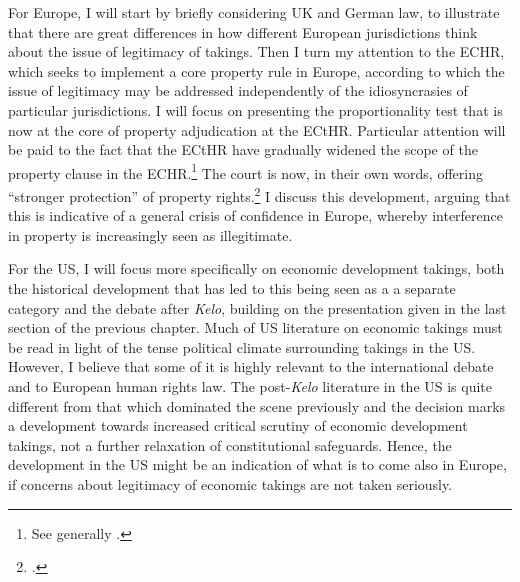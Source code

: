 For Europe, I will start by briefly considering UK and German law, to illustrate that there are great differences in how different European jurisdictions think about the issue of legitimacy of takings. Then I turn my attention to the ECHR, which seeks to implement a core property rule in Europe, according to which the issue of legitimacy may be addressed independently of the idiosyncrasies of particular jurisdictions. I will focus on presenting the proportionality test that is now at the core of property adjudication at the ECtHR. Particular attention will be paid to the fact that the ECtHR have gradually widened the scope of the property clause in the ECHR.\footnote{See generally \cite{allen10}.} The court is now, in their own words, offering ``stronger protection'' of property rights.\footcite[135]{lindheim12} I discuss this development, arguing that this is indicative of a general crisis of confidence in Europe, whereby interference in property is increasingly seen as illegitimate.

For the US, I will focus more specifically on economic development takings, both the historical development that has led to this being seen as a a separate category and the debate after {\it Kelo}, building on the presentation given in the last section of the previous chapter. Much of US literature on economic takings must be read in light of the tense political climate surrounding takings in the US. However, I believe that some of it is highly relevant to the international debate and to European human rights law. The post-{\it Kelo} literature in the US is quite different from that which dominated the scene previously and the decision marks a development towards increased critical scrutiny of economic development takings, not a further relaxation of constitutional safeguards. Hence, the development in the US might be an indication of what is to come also in Europe, if concerns about legitimacy of economic takings are not taken seriously.


